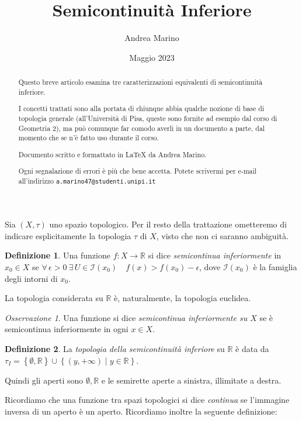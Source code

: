 \documentclass[a4paper, 11pt]{article}
\title{Semicontinuità Inferiore}
\author{Andrea Marino}
\date{Maggio 2023}
\newcommand{\R}{\mathbb{R}}
\newcommand{\I}[1]{\mathcal{I}(#1)}
\theoremstyle{plain} 	%
\theoremstyle{definition}
\newtheorem{definizione}{Definizione}
\theoremstyle{remark}
\newtheorem*{oss*}{Osservazione}
\begin{document}
    \maketitle
    
    \begin{abstract}
        Questo breve articolo esamina tre caratterizzazioni equivalenti di semicontinuità inferiore. 

        I concetti trattati sono alla portata di chiunque abbia qualche nozione di base di topologia generale (all'Università di Pisa, queste sono fornite ad esempio dal corso di Geometria 2), ma può comunque far comodo 
        averli in un documento a parte, dal momento che se n'è fatto uso durante il corso.
        \smallskip

        Documento scritto e formattato in \LaTeX{} da Andrea Marino. 

        Ogni segnalazione di errori è più che bene accetta. Potete scrivermi per e-mail all'indirizzo 
		\texttt{a.marino47@studenti.unipi.it}
    \end{abstract}

    Sia $\left(X,\tau\right)$ uno spazio topologico. Per il resto della trattazione ometteremo di indicare esplicitamente la topologia $\tau$ di $X$, visto che non ci saranno ambiguità.
    \begin{definizione}
        Una funzione $f\colon X\to\R$ si dice \emph{semicontinua inferiormente} in $x_0\in X$ se $\forall\,\epsilon>0\ \exists\,U\in\I{x_0}\quad f(x)>f(x_0)-\epsilon$, dove $\I{x_0}$ è la famiglia degli intorni di $x_0$.
    \end{definizione}
    La topologia considerata su $\R$ è, naturalmente, la topologia euclidea.
    \begin{oss*}
        Una funzione si dice \emph{semicontinua inferiormente su $X$} se è semicontinua inferiormente in ogni $x\in X$.
    \end{oss*}
    \begin{definizione}\label{def:top_sci}
        La \emph{topologia della semicontinuità inferiore} su $\R$ è data da $\tau_I=\left\{\emptyset,\R\right\}\cup\left\{(y,+\infty)\mid y\in\R\right\}$.
    \end{definizione}
    Quindi gli aperti sono $\emptyset, \R$ e le semirette aperte a sinistra, illimitate a destra.

    Ricordiamo che una funzione tra spazi topologici si dice \emph{continua} se l'immagine inversa di un aperto è un aperto. Ricordiamo inoltre la seguente definizione:
\end{document}
